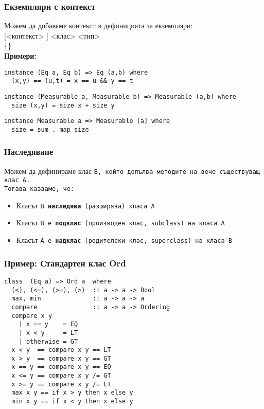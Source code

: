 \documentclass[alsotrans]{beamerswitch}
\begin{document}
\begin{frame}[fragile]
  \frametitle{Екземпляри с контекст}
  Можем да добавяме контекст в дефиницията за екземпляри:\\
   [<контекст> \tta{=>}] <клас> <тип> \\
  \hspace{1em} \{<дефиниция-на-метод>\}\\[2ex]
  \pause
  \textbf{Примери:}
\small
\begin{lstlisting}
instance (Eq a, Eq b) => Eq (a,b) where
  (x,y) == (u,t) = x == u && y == t
\end{lstlisting}
  \pause
\begin{lstlisting}
instance (Measurable a, Measurable b) => Measurable (a,b) where
  size (x,y) = size x + size y
\end{lstlisting}
  \pause
\begin{lstlisting}
instance Measurable a => Measurable [a] where
  size = sum . map size
\end{lstlisting}
\end{frame}

\begin{frame}[fragile]
  \frametitle{Наследяване}
  Можем да дефинираме клас \tt{B}, който допълва методите на вече съществуващ клас \tt{A}.\\
  Тогава казваме, че:
  \begin{itemize}[<+->]
  \item Класът \tt{B} \textbf{наследява} (разширява) класа \tt{A}
  \item Класът \tt{B} е \textbf{подклас} (производен клас, subclass) на класа \tt{A}
  \item Класът \tt{A} е \textbf{надклас} (родителски клас, superclass) на класа \tt{B}
  \end{itemize}
\end{frame}

\begin{frame}[fragile]
  \frametitle{Пример: Стандартен клас Ord}
\begin{lstlisting}
class  (Eq a) => Ord a  where
  (<), (<=), (>=), (>)  :: a -> a -> Bool
  max, min              :: a -> a -> a
  compare               :: a -> a -> Ordering
  compare x y
    | x == y    = EQ
    | x < y     = LT
    | otherwise = GT
  x < y  == compare x y == LT
  x > y  == compare x y == GT
  x == y == compare x y == EQ
  x <= y == compare x y /= GT
  x >= y == compare x y /= LT
  max x y == if x > y then x else y
  min x y == if x < y then x else y
\end{lstlisting}
\end{frame}
\end{document}
